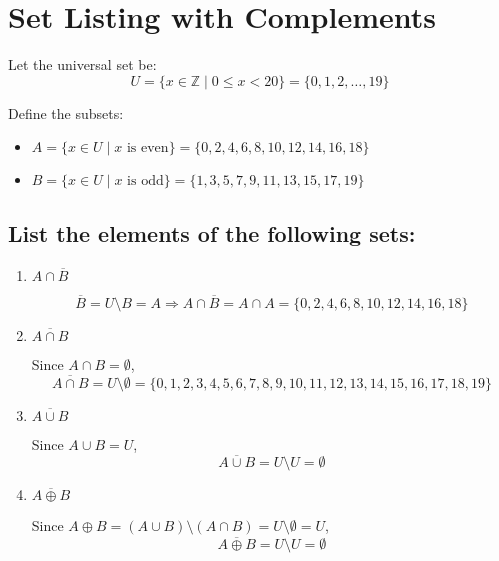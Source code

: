 \documentclass{article}
\begin{document}
\section*{Set Listing with Complements}

Let the universal set be:
\[
U = \{x \in \mathbb{Z} \mid 0 \leq x < 20\} = \{0, 1, 2, \ldots, 19\}
\]

Define the subsets:
\begin{itemize}
  \item \( A = \{x \in U \mid x \text{ is even} \} = \{0, 2, 4, 6, 8, 10, 12, 14, 16, 18\} \)
  \item \( B = \{x \in U \mid x \text{ is odd} \} = \{1, 3, 5, 7, 9, 11, 13, 15, 17, 19\} \)
\end{itemize}

\subsection*{List the elements of the following sets:}

\begin{enumerate}[label=\textbf{\arabic*.}]
  \item \( A \cap \overline{B} \)

  \[
  \overline{B} = U \setminus B = A \Rightarrow A \cap \overline{B} = A \cap A = \boxed{\{0, 2, 4, 6, 8, 10, 12, 14, 16, 18\}}
  \]

  \item \( \overline{A \cap B} \)

  Since \( A \cap B = \emptyset \),  
  \[
  \overline{A \cap B} = U \setminus \emptyset = \boxed{\{0, 1, 2, 3, 4, 5, 6, 7, 8, 9, 10, 11, 12, 13, 14, 15, 16, 17, 18, 19\}}
  \]

  \item \( \overline{A \cup B} \)

  Since \( A \cup B = U \),  
  \[
  \overline{A \cup B} = U \setminus U = \boxed{\emptyset}
  \]

  \item \( \overline{A \oplus B} \)

  Since \( A \oplus B = (A \cup B) \setminus (A \cap B) = U \setminus \emptyset = U \),  
  \[
  \overline{A \oplus B} = U \setminus U = \boxed{\emptyset}
  \]

\end{enumerate}
\end{document}
